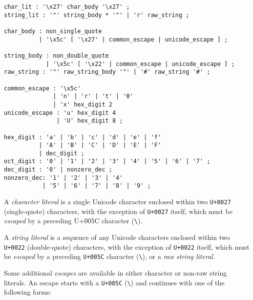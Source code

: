 \documentclass[]{article}
\begin{document}
\begin{verbatim}
char_lit : '\x27' char_body '\x27' ;
string_lit : '"' string_body * '"' | 'r' raw_string ;

char_body : non_single_quote
          | '\x5c' [ '\x27' | common_escape | unicode_escape ] ;

string_body : non_double_quote
            | '\x5c' [ '\x22' | common_escape | unicode_escape ] ;
raw_string : '"' raw_string_body '"' | '#' raw_string '#' ;

common_escape : '\x5c'
              | 'n' | 'r' | 't' | '0'
              | 'x' hex_digit 2
unicode_escape : 'u' hex_digit 4
               | 'U' hex_digit 8 ;

hex_digit : 'a' | 'b' | 'c' | 'd' | 'e' | 'f'
          | 'A' | 'B' | 'C' | 'D' | 'E' | 'F'
          | dec_digit ;
oct_digit : '0' | '1' | '2' | '3' | '4' | '5' | '6' | '7' ;
dec_digit : '0' | nonzero_dec ;
nonzero_dec: '1' | '2' | '3' | '4'
           | '5' | '6' | '7' | '8' | '9' ;
\end{verbatim}

A \emph{character literal} is a single Unicode character enclosed within
two \texttt{U+0027} (single-quote) characters, with the exception of
\texttt{U+0027} itself, which must be \emph{escaped} by a preceding
U+005C character (\texttt{\textbackslash{}}).

A \emph{string literal} is a sequence of any Unicode characters enclosed
within two \texttt{U+0022} (double-quote) characters, with the exception
of \texttt{U+0022} itself, which must be \emph{escaped} by a preceding
\texttt{U+005C} character (\texttt{\textbackslash{}}), or a \emph{raw
string literal}.

Some additional \emph{escapes} are available in either character or
non-raw string literals. An escape starts with a \texttt{U+005C}
(\texttt{\textbackslash{}}) and continues with one of the following
forms:
\end{document}
